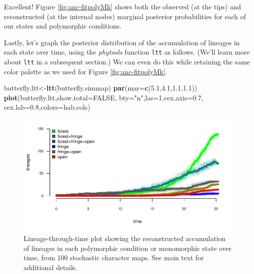 \documentclass[fleqn,10pt,lineno]{wlpeerj} %
\newenvironment{Shaded}{\begin{snugshade}}{\end{snugshade}}
\newcommand{\AttributeTok}[1]{\textcolor[rgb]{0.13,0.29,0.53}{#1}}
\newcommand{\ConstantTok}[1]{\textcolor[rgb]{0.56,0.35,0.01}{#1}}
\newcommand{\DecValTok}[1]{\textcolor[rgb]{0.00,0.00,0.81}{#1}}
\newcommand{\FloatTok}[1]{\textcolor[rgb]{0.00,0.00,0.81}{#1}}
\newcommand{\FunctionTok}[1]{\textcolor[rgb]{0.13,0.29,0.53}{\textbf{#1}}}
\newcommand{\NormalTok}[1]{#1}
\newcommand{\OtherTok}[1]{\textcolor[rgb]{0.56,0.35,0.01}{#1}}
\newcommand{\StringTok}[1]{\textcolor[rgb]{0.31,0.60,0.02}{#1}}
\begin{document}
Excellent! Figure \ref{fig:anc-fitpolyMk} shows both the observed (at the tips) and reconstructed (at the internal nodes) marginal posterior probabilities for each of our states and polymorphic conditions.

Lastly, let's graph the posterior distribution of the accumulation of lineages in each state over time, using the \emph{phytools} function \texttt{ltt} as follows. (We'll learn more about \texttt{ltt} in a subsequent section.) We can even do this while retaining the same color palette as we used for Figure \ref{fig:anc-fitpolyMk}.

\begin{Shaded}
\begin{Highlighting}[]
\NormalTok{butterfly.ltt}\OtherTok{\textless{}{-}}\FunctionTok{ltt}\NormalTok{(butterfly.simmap)}
\FunctionTok{par}\NormalTok{(}\AttributeTok{mar=}\FunctionTok{c}\NormalTok{(}\FloatTok{5.1}\NormalTok{,}\FloatTok{4.1}\NormalTok{,}\FloatTok{1.1}\NormalTok{,}\FloatTok{1.1}\NormalTok{))}
\FunctionTok{plot}\NormalTok{(butterfly.ltt,}\AttributeTok{show.total=}\ConstantTok{FALSE}\NormalTok{,}
  \AttributeTok{bty=}\StringTok{"n"}\NormalTok{,}\AttributeTok{las=}\DecValTok{1}\NormalTok{,}\AttributeTok{cex.axis=}\FloatTok{0.7}\NormalTok{,}
  \AttributeTok{cex.lab=}\FloatTok{0.8}\NormalTok{,}\AttributeTok{colors=}\NormalTok{hab.cols)}
\end{Highlighting}
\end{Shaded}

\begin{figure}
\includegraphics[width=1\linewidth]{Revell.phytools-v2_peerj_files/figure-latex/ltt-fitpolyMk-1} \caption{Lineage-through-time plot showing the reconstructed accumulation of lineages in each polymorphic condition or monomorphic state over time, from 100 stochastic character maps. See main text for additional details.}\label{fig:ltt-fitpolyMk}
\end{figure}
\end{document}
